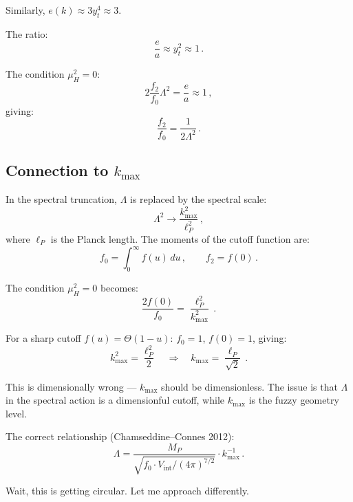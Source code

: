 \documentclass[11pt,a4paper]{article}
\begin{document}
Similarly, $e(k) \approx 3y_t^4 \approx 3$.

The ratio:
\begin{equation}
\frac{e}{a} \approx y_t^2 \approx 1\,.
\end{equation}

The condition $\mu_H^2 = 0$:
\begin{equation}
2\frac{f_2}{f_0}\Lambda^2 = \frac{e}{a} \approx 1\,,
\end{equation}
giving:
\begin{equation}
\frac{f_2}{f_0} = \frac{1}{2\Lambda^2}\,.
\end{equation}

\subsection{Connection to $k_{\max}$}

In the spectral truncation, $\Lambda$ is replaced by the spectral scale:
\begin{equation}
\Lambda^2 \to \frac{k_{\max}^2}{\ell_P^2}\,,
\end{equation}
where $\ell_P$ is the Planck length. The moments of the cutoff function are:
\begin{equation}
f_0 = \int_0^\infty f(u)\,du\,,\qquad f_2 = f(0)\,.
\end{equation}

The condition $\mu_H^2 = 0$ becomes:
\begin{equation}
\frac{2f(0)}{f_0} = \frac{\ell_P^2}{k_{\max}^2}\,.
\end{equation}

For a sharp cutoff $f(u) = \Theta(1-u)$: $f_0 = 1$, $f(0) = 1$, giving:
\begin{equation}
k_{\max}^2 = \frac{\ell_P^2}{2} \quad\Rightarrow\quad k_{\max} = \frac{\ell_P}{\sqrt{2}}\,.
\end{equation}

This is dimensionally wrong --- $k_{\max}$ should be dimensionless. The issue is that $\Lambda$ in the spectral action is a dimensionful cutoff, while $k_{\max}$ is the fuzzy geometry level.

The correct relationship (Chamseddine--Connes 2012):
\begin{equation}
\Lambda = \frac{M_P}{\sqrt{f_0 \cdot V_{\mathrm{int}} / (4\pi)^{7/2}}} \cdot k_{\max}^{-1}\,.
\end{equation}

Wait, this is getting circular. Let me approach differently.
\end{document}
